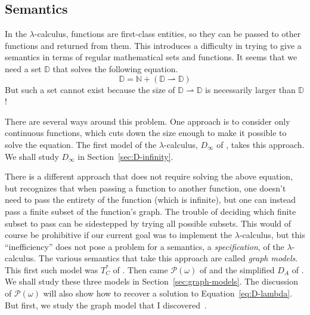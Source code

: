 \documentclass{tufte-handout}
\newcommand{\pto}[0]{\rightharpoonup}
\begin{document}
\subsection{Semantics}

In the $\lambda$-calculus, functions are first-class entities, so they
can be passed to other functions and returned from them. This
introduces a difficulty in trying to give a semantics in terms of
regular mathematical sets and functions. It seems that we need a set
$\mathbb{D}$ that solves the following equation.
\begin{equation}
  \label{eq:D-lambda}
   \mathbb{D} = \mathbb{N} + (\mathbb{D} \pto \mathbb{D})
\end{equation}
But such a set cannot exist because the size of $\mathbb{D} \pto
\mathbb{D}$ is necessarily larger than $\mathbb{D}$!

There are several ways around this problem. One approach is to
consider only continuous functions, which cuts down the size enough to
make it possible to solve the equation. The first model of the
$\lambda$-calculus, $D_\infty$ of \citet{Scott:1970dp}, takes this
approach. We shall study $D_\infty$ in Section~\ref{sec:D-infinity}.

There is a different approach that does not require solving the above
equation, but recognizes that when passing a function to another
function, one doesn't need to pass the entirety of the function (which
is infinite), but one can instead pass a finite subset of the
function's graph.  The trouble of deciding which finite subset to pass
can be sidestepped by trying all possible subsets. This would of
course be prohibitive if our current goal was to implement the
$\lambda$-calculus, but this ``inefficiency'' does not pose a problem
for a semantics, a \emph{specification}, of the
$\lambda$-calculus. The various semantics that take this approach are
called \emph{graph models}. This first such model was $T^{*}_C$ of
\citet{Plotkin:1972aa}. Then came $\mathcal{P}(\omega)$ of
\citet{Scott:1976lq} and the simplified $D_A$ of
\citet{Engeler:1981aa}. We shall study these three models in
Section~\ref{sec:graph-models}. The discussion of
$\mathcal{P}(\omega)$ will also show how to recover a solution to
Equation~\eqref{eq:D-lambda}.  But first, we study the graph model
that I discovered~\citep{Siek:2017ab}.
\end{document}
